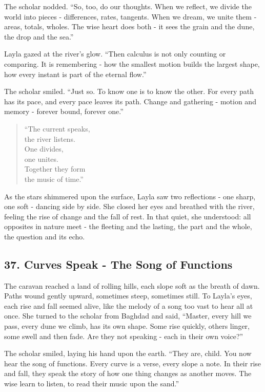 \documentclass[
  letterpaper,
  DIV=11,
  numbers=noendperiod]{scrreprt}
\begin{document}
The scholar nodded. ``So, too, do our thoughts. When we reflect, we
divide the world into pieces - differences, rates, tangents. When we
dream, we unite them - areas, totals, wholes. The wise heart does both -
it sees the grain and the dune, the drop and the sea.''

Layla gazed at the river's glow. ``Then calculus is not only counting or
comparing. It is remembering - how the smallest motion builds the
largest shape, how every instant is part of the eternal flow.''

The scholar smiled. ``Just so. To know one is to know the other. For
every path has its pace, and every pace leaves its path. Change and
gathering - motion and memory - forever bound, forever one.''

\begin{quote}
``The current speaks,\\
the river listens.\\
One divides,\\
one unites.\\
Together they form\\
the music of time.''
\end{quote}

As the stars shimmered upon the surface, Layla saw two reflections - one
sharp, one soft - dancing side by side. She closed her eyes and breathed
with the river, feeling the rise of change and the fall of rest. In that
quiet, she understood: all opposites in nature meet - the fleeting and
the lasting, the part and the whole, the question and its echo.

\subsection{37. Curves Speak - The Song of
Functions}\label{curves-speak---the-song-of-functions}

The caravan reached a land of rolling hills, each slope soft as the
breath of dawn. Paths wound gently upward, sometimes steep, sometimes
still. To Layla's eyes, each rise and fall seemed alive, like the melody
of a song too vast to hear all at once. She turned to the scholar from
Baghdad and said, ``Master, every hill we pass, every dune we climb, has
its own shape. Some rise quickly, others linger, some swell and then
fade. Are they not speaking - each in their own voice?''

The scholar smiled, laying his hand upon the earth. ``They are, child.
You now hear the song of functions. Every curve is a verse, every slope
a note. In their rise and fall, they speak the story of how one thing
changes as another moves. The wise learn to listen, to read their music
upon the sand.''
\end{document}
